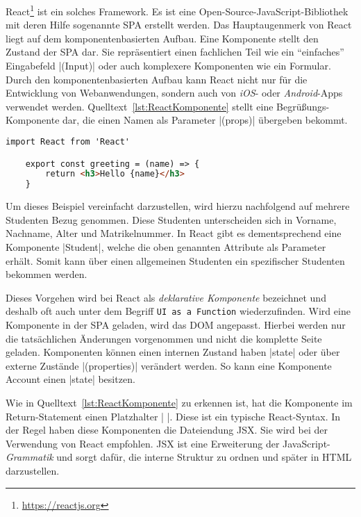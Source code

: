 React\footnote{\url{https://reactjs.org}} ist ein solches Framework.
Es ist eine Open-Source-JavaScript-Bibliothek mit deren Hilfe sogenannte \ac{SPA} erstellt werden.\autocite[Vgl.][]{hartmann2019react}
Das Hauptaugenmerk von React liegt auf dem komponentenbasierten Aufbau.
Eine Komponente stellt den Zustand der \ac{SPA} dar.
Sie repräsentiert einen fachlichen Teil wie \zb ein \enquote{einfaches} Eingabefeld \jinline|(Input)| oder auch komplexere Komponenten wie ein Formular.
Durch den komponentenbasierten Aufbau kann React nicht nur für die Entwicklung von Webanwendungen, sondern auch von \emph{iOS}- oder \emph{Android}-Apps verwendet werden.
Quelltext~\vref{lst:ReactKomponente} stellt eine Begrüßungs-Komponente dar, die einen Namen als Parameter \jinline|(props)| übergeben bekommt.

\begin{lstlisting}[caption={React-Komponente: Greeting},label={lst:ReactKomponente},language=HTML, showstringspaces={false}]
	import React from 'React'

	export const greeting = (name) => {
		return <h3>Hello {name}</h3>
	}
\end{lstlisting}

Um dieses Beispiel vereinfacht darzustellen, wird hierzu nachfolgend auf mehrere Studenten Bezug genommen.
Diese Studenten unterscheiden sich \zb in Vorname, Nachname, Alter und Matrikelnummer.
In React gibt es dementsprechend eine Komponente \jinline|Student|, welche die oben genannten Attribute als Parameter erhält.
Somit kann über einen allgemeinen Studenten ein spezifischer Studenten bekommen werden.

Dieses Vorgehen wird bei React als \emph{deklarative Komponente} bezeichnet und deshalb oft auch unter dem Begriff \texttt{UI as a Function} wiederzufinden.\autocite[Vgl.][]{hartmann2019react}
Wird eine Komponente in der \acs{SPA} geladen, wird das \acs{DOM} angepasst.
Hierbei werden nur die tatsächlichen Änderungen vorgenommen und nicht die komplette Seite geladen. \newline
Komponenten können einen internen Zustand haben \jinline|state| oder über externe Zustände \jinline|(properties)| verändert werden.
So kann \zb eine Komponente Account einen \jinline|state| besitzen.

Wie in Quelltext~\vref{lst:ReactKomponente} zu erkennen ist, hat die Komponente im Return-Statement einen Platzhalter \jinline|{ }|.
Diese ist ein typische React-Syntax.
In der Regel haben diese Komponenten die Dateiendung \acs{JSX}.
Sie wird bei der Verwendung von React empfohlen.
\acs{JSX} ist eine Erweiterung der JavaScript-\emph{Grammatik} und sorgt dafür, die interne Struktur zu ordnen und später in \acs{HTML} darzustellen.\autocite[Vgl.][]{WasIstJSX}


